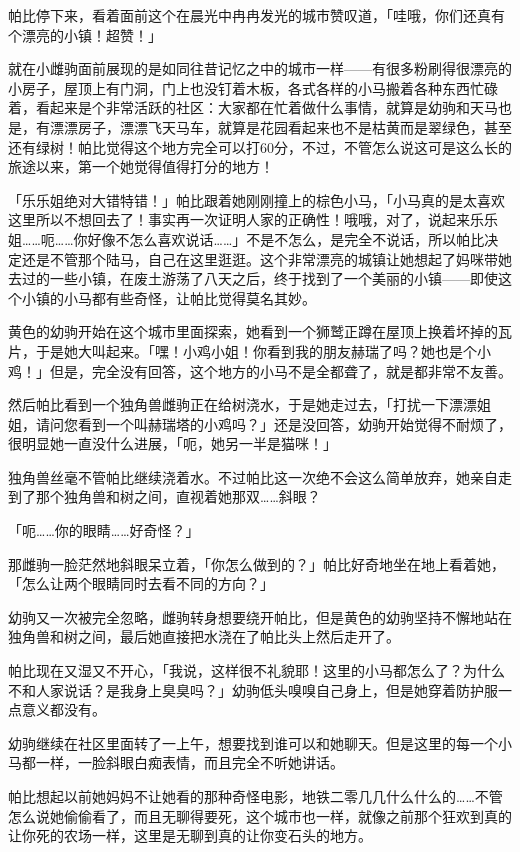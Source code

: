 帕比停下来，看着面前这个在晨光中冉冉发光的城市赞叹道，「哇哦，你们还真有个漂亮的小镇！超赞！」

就在小雌驹面前展现的是如同往昔记忆之中的城市一样——有很多粉刷得很漂亮的小房子，屋顶上有门洞，门上也没钉着木板，各式各样的小马搬着各种东西忙碌着，看起来是个非常活跃的社区：大家都在忙着做什么事情，就算是幼驹和天马也是，有漂漂房子，漂漂飞天马车，就算是花园看起来也不是枯黄而是翠绿色，甚至还有绿树！帕比觉得这个地方完全可以打60分，不过，不管怎么说这可是这么长的旅途以来，第一个她觉得值得打分的地方！

「乐乐姐绝对大错特错！」帕比跟着她刚刚撞上的棕色小马，「小马真的是太喜欢这里所以不想回去了！事实再一次证明人家的正确性！哦哦，对了，说起来乐乐姐……呃……你好像不怎么喜欢说话……」不是不怎么，是完全不说话，所以帕比决定还是不管那个陆马，自己在这里逛逛。这个非常漂亮的城镇让她想起了妈咪带她去过的一些小镇，在废土游荡了八天之后，终于找到了一个美丽的小镇——即使这个小镇的小马都有些奇怪，让帕比觉得莫名其妙。

黄色的幼驹开始在这个城市里面探索，她看到一个狮鹫正蹲在屋顶上换着坏掉的瓦片，于是她大叫起来。「嘿！小鸡小姐！你看到我的朋友赫瑞了吗？她也是个小鸡！」但是，完全没有回答，这个地方的小马不是全都聋了，就是都非常不友善。

然后帕比看到一个独角兽雌驹正在给树浇水，于是她走过去，「打扰一下漂漂姐姐，请问您看到一个叫赫瑞塔的小鸡吗？」还是没回答，幼驹开始觉得不耐烦了，很明显她一直没什么进展，「呃，她另一半是猫咪！」

独角兽丝毫不管帕比继续浇着水。不过帕比这一次绝不会这么简单放弃，她亲自走到了那个独角兽和树之间，直视着她那双……斜眼？

「呃……你的眼睛……好奇怪？」

那雌驹一脸茫然地斜眼呆立着，「你怎么做到的？」帕比好奇地坐在地上看着她，「怎么让两个眼睛同时去看不同的方向？」

幼驹又一次被完全忽略，雌驹转身想要绕开帕比，但是黄色的幼驹坚持不懈地站在独角兽和树之间，最后她直接把水浇在了帕比头上然后走开了。

帕比现在又湿又不开心，「我说，这样很不礼貌耶！这里的小马都怎么了？为什么不和人家说话？是我身上臭臭吗？」幼驹低头嗅嗅自己身上，但是她穿着防护服一点意义都没有。

幼驹继续在社区里面转了一上午，想要找到谁可以和她聊天。但是这里的每一个小马都一样，一脸斜眼白痴表情，而且完全不听她讲话。

帕比想起以前她妈妈不让她看的那种奇怪电影，地铁二零几几什么什么的……不管怎么说她偷偷看了，而且无聊得要死，这个城市也一样，就像之前那个狂欢到真的让你死的农场一样，这里是无聊到真的让你变石头的地方。

